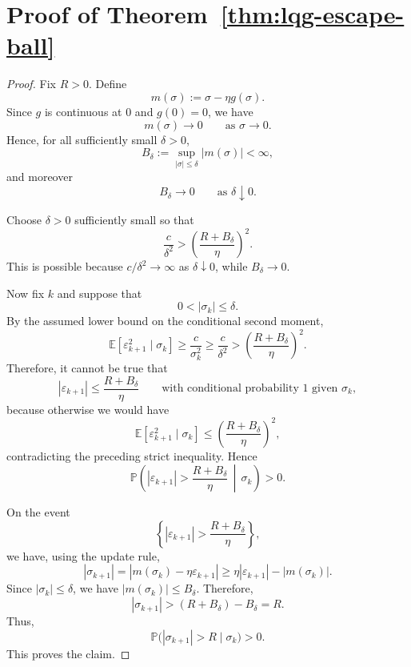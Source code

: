 \section{Proof of Theorem~\ref{thm:lqg-escape-ball} }
\label{sec:app-proof-escape-ball}

\begin{proof}
Fix \(R>0\). Define
\[
m(\sigma):=\sigma-\eta g(\sigma).
\]
Since \(g\) is continuous at \(0\) and \(g(0)=0\), we have
\[
m(\sigma)\to 0
\qquad \text{as } \sigma\to 0.
\]
Hence, for all sufficiently small \(\delta>0\),
\[
B_\delta:=\sup_{|\sigma|\le \delta}|m(\sigma)|<\infty,
\]
and moreover
\[
B_\delta\to 0
\qquad \text{as } \delta\downarrow 0.
\]

Choose \(\delta>0\) sufficiently small so that
\[
\frac{c}{\delta^2}>
\left(\frac{R+B_\delta}{\eta}\right)^2.
\]
This is possible because \(c/\delta^2\to\infty\) as \(\delta\downarrow0\), while
\(B_\delta\to0\).

Now fix \(k\) and suppose that
\[
0<|\sigma_k|\le \delta.
\]
By the assumed lower bound on the conditional second moment,
\[
\mathbb E[\varepsilon_{k+1}^2\mid \sigma_k]
\ge
\frac{c}{\sigma_k^2}
\ge
\frac{c}{\delta^2}
>
\left(\frac{R+B_\delta}{\eta}\right)^2.
\]
Therefore, it cannot be true that
\[
|\varepsilon_{k+1}|
\le
\frac{R+B_\delta}{\eta}
\qquad \text{with conditional probability }1
\text{ given } \sigma_k,
\]
because otherwise we would have
\[
\mathbb E[\varepsilon_{k+1}^2\mid \sigma_k]
\le
\left(\frac{R+B_\delta}{\eta}\right)^2,
\]
contradicting the preceding strict inequality. Hence
\[
\mathbb P\!\left(
|\varepsilon_{k+1}|>\frac{R+B_\delta}{\eta}
\,\middle|\,
\sigma_k
\right)>0.
\]

On the event
\[
\left\{
|\varepsilon_{k+1}|>\frac{R+B_\delta}{\eta}
\right\},
\]
we have, using the update rule,
\[
|\sigma_{k+1}|
=
|m(\sigma_k)-\eta\varepsilon_{k+1}|
\ge
\eta|\varepsilon_{k+1}|-|m(\sigma_k)|.
\]
Since \(|\sigma_k|\le \delta\), we have \(|m(\sigma_k)|\le B_\delta\). Therefore,
\[
|\sigma_{k+1}|
>
(R+B_\delta)-B_\delta
=
R.
\]
Thus,
\[
\mathbb P\bigl(|\sigma_{k+1}|>R\mid \sigma_k\bigr)>0.
\]
This proves the claim.
\end{proof}